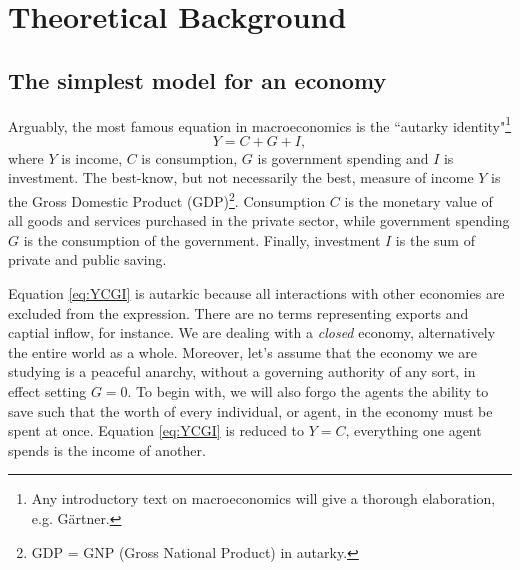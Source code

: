 \documentclass[10pt, a4paper]{amsart}
\begin{document}
\section{Theoretical Background}
\subsection{The simplest model for an economy}
Arguably, the most famous equation in macroeconomics is the ``autarky identity"\footnote{Any introductory text on macroeconomics will give a thorough elaboration, e.g. Gärtner.}
\begin{equation}
\label{eq:YCGI}
Y = C + G + I,
\end{equation}
where $Y$ is income, $C$ is consumption, $G$ is government spending and $I$ is investment. The best-know, but not necessarily the best, measure of income $Y$ is the Gross Domestic Product (GDP)\footnote{GDP = GNP (Gross National Product) in autarky.}. Consumption $C$ is the monetary value of all goods and services purchased in the private sector, while government spending $G$ is the consumption of the government. Finally, investment $I$ is the sum of private and public saving. 

Equation \ref{eq:YCGI} is autarkic because all interactions with other economies are excluded from the expression. There are no terms representing exports and captial inflow, for instance. We are dealing with a \emph{closed} economy, alternatively the entire world as a whole. Moreover, let's assume that the economy we are studying is a peaceful anarchy, without a governing authority of any sort, in effect setting $G = 0$. To begin with, we will also forgo the agents the ability to save such that the worth of every individual, or agent, in the economy must be spent at once. Equation \ref{eq:YCGI} is reduced to $Y = C$, everything one agent spends is the income of another.
\end{document}

